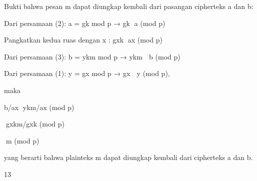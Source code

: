 \documentclass{article}
\begin{document}

Bukti bahwa pesan m dapat diungkap kembali dari pasangan cipherteks a dan b: 

Dari persamaan (2): a = gk mod p   →  gk a (mod p)


Pangkatkan kedua ruas dengan x : gxk ax (mod p)


Dari persamaan (3):  b = ykm mod p   → ykm  b (mod p) 


Dari persamaan (1):  y = gx mod p  →  gx  y (mod p), 

maka 

b/ax ykm/ax (mod p)

gxkm/gxk (mod p)

m (mod p)

yang berarti bahwa plainteks m dapat diungkap kembali dari cipherteks a dan b.

13
\end{document}
